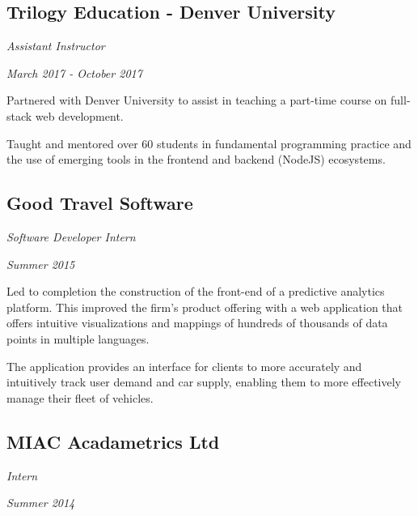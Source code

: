 \subsection*{Trilogy Education - Denver University}
\noindent\begin{minipage}[b]{0.5\textwidth}
  \flushleft
  \emph{Assistant Instructor}
\end{minipage}
\noindent\begin{minipage}[b]{0.5\textwidth}
  \flushright
  \emph{March 2017 - October 2017}
\end{minipage}

Partnered with Denver University to assist in teaching a part-time course on
full-stack web development.

Taught and mentored over 60 students in fundamental programming practice and the
use of emerging tools in the frontend and backend (NodeJS) ecosystems.

\subsection*{Good Travel Software}
\noindent\begin{minipage}[b]{0.5\textwidth}
  \flushleft
  \emph{Software Developer Intern}
\end{minipage}
\noindent\begin{minipage}[b]{0.5\textwidth}
  \flushright
  \emph{Summer 2015}
\end{minipage}

Led to completion the construction of the front-end of a predictive analytics
platform. This improved the firm's product offering with a web application that
offers intuitive visualizations and mappings of hundreds of thousands of data
points in multiple languages.

The application provides an interface for clients to more accurately and
intuitively track user demand and car supply, enabling them to more effectively
manage their fleet of vehicles.

\subsection*{MIAC Acadametrics Ltd}
\noindent\begin{minipage}[b]{0.5\textwidth}
  \flushleft
  \emph{Intern}
\end{minipage}
\noindent\begin{minipage}[b]{0.5\textwidth}
  \flushright
  \emph{Summer 2014}
\end{minipage}


